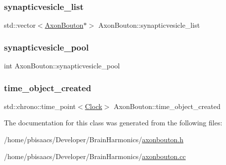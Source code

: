 \subsubsection{\texorpdfstring{synapticvesicle\+\_\+list}{synapticvesicle\_list}}
{\footnotesize\ttfamily std\+::vector$<$\mbox{\hyperlink{classAxonBouton}{Axon\+Bouton}}$\ast$$>$ Axon\+Bouton\+::synapticvesicle\+\_\+list\hspace{0.3cm}{\ttfamily [protected]}}

\mbox{\label{classAxonBouton_a6af09fee2eb7a38e8591770bc9c070ac}} 
\subsubsection{\texorpdfstring{synapticvesicle\+\_\+pool}{synapticvesicle\_pool}}
{\footnotesize\ttfamily int Axon\+Bouton\+::synapticvesicle\+\_\+pool\hspace{0.3cm}{\ttfamily [private]}}

\mbox{\label{classAxonBouton_a26b17307437394ff14bfb5ef8dfad1e5}} 
\subsubsection{\texorpdfstring{time\+\_\+object\+\_\+created}{time\_object\_created}}
{\footnotesize\ttfamily std\+::chrono\+::time\+\_\+point$<$\mbox{\hyperlink{universe_8h_a0ef8d951d1ca5ab3cfaf7ab4c7a6fd80}{Clock}}$>$ Axon\+Bouton\+::time\+\_\+object\+\_\+created\hspace{0.3cm}{\ttfamily [private]}}



The documentation for this class was generated from the following files\+:\begin{DoxyCompactItemize}
\item 
/home/pbisaacs/\+Developer/\+Brain\+Harmonics/\mbox{\hyperlink{axonbouton_8h}{axonbouton.\+h}}\item 
/home/pbisaacs/\+Developer/\+Brain\+Harmonics/\mbox{\hyperlink{axonbouton_8cc}{axonbouton.\+cc}}\end{DoxyCompactItemize}
